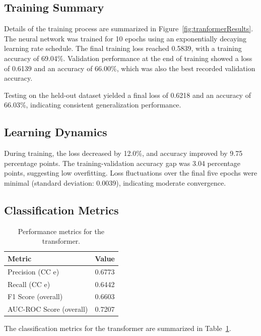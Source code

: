 \documentclass{pracalicmgr}
\begin{document}
\subsection{Training Summary}

Details of the training process are summarized in Figure~\ref{fig:tranformerResults}. The neural network was trained for 10 epochs using an exponentially decaying learning rate schedule. The final training loss reached 0.5839, with a training accuracy of 69.04\%. Validation performance at the end of training showed a loss of 0.6139 and an accuracy of 66.00\%, which was also the best recorded validation accuracy.

Testing on the held-out dataset yielded a final loss of 0.6218 and an accuracy of 66.03\%, indicating consistent generalization performance.

\subsection{Learning Dynamics}

During training, the loss decreased by 12.0\%, and accuracy improved by 9.75 percentage points. The training-validation accuracy gap was 3.04 percentage points, suggesting low overfitting. Loss fluctuations over the final five epochs were minimal (standard deviation: 0.0039), indicating moderate convergence.

\subsection{Classification Metrics}

\begin{table}[H]
    \centering
    \begin{tabular}{lc}
        \toprule
        \textbf{Metric} & \textbf{Value} \\
        \midrule
        Precision (CC e) & 0.6773 \\
        Recall (CC e)    & 0.6442 \\
        F1 Score (overall) & 0.6603 \\
        AUC-ROC Score (overall) & 0.7207 \\
        \bottomrule
    \end{tabular}
    \caption{Performance metrics for the transformer.}
    \label{tab:cc_metrics}
\end{table}

The classification metrics for the transformer are summarized in Table~\ref{tab:cc_metrics}.
\end{document}
